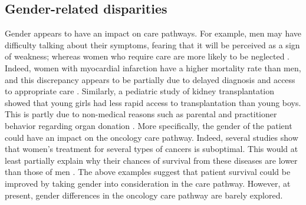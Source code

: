 \subsection*{Gender-related disparities}

Gender appears to have an impact on care pathways. For example, men may have
difficulty talking about their symptoms, fearing that it will be perceived as a
sign of weakness; whereas women who require care are more likely to be neglected
\cite{ferrari_gender_2018}. Indeed, women with myocardial infarction have a
higher mortality rate than men, and this discrepancy appears to be partially due
to delayed diagnosis and access to appropriate care
\cite{bugiardini_delayed_2017}. Similarly, a pediatric study of kidney
transplantation showed that young girls had less rapid access to transplantation
than young boys. This is partly due to non-medical reasons such as parental and
practitioner behavior regarding organ donation \cite{hogan_j_gender_2016}. More
specifically, the gender of the patient could have an impact on the oncology
care pathway. Indeed, several studies show that women's treatment for several
types of cancers is suboptimal. This would at least partially explain why their
chances of survival from these diseases are lower than those of men
\cite{park_a_undertreatment_2019,carter_paulson_e_gender_2009,rose_sex_2016}.
The above examples suggest that patient survival could be improved by taking
gender into consideration in the care pathway. However, at present, gender
differences in the oncology care pathway are barely explored.
